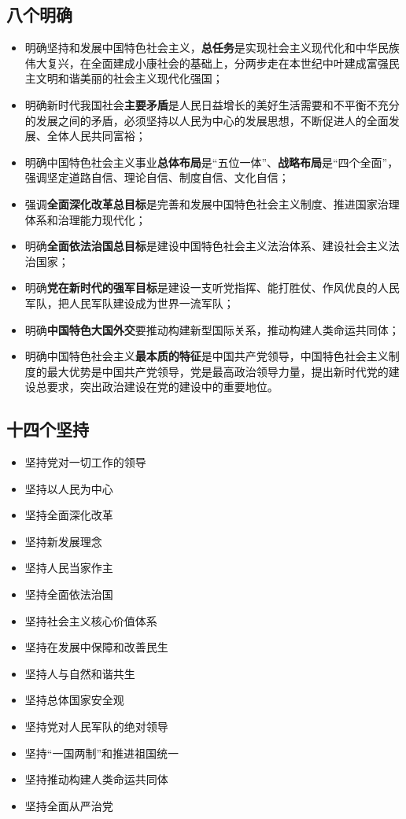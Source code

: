 \documentclass[a4paper, UTF8]{ctexart}
\begin{document}
    \subsection{八个明确}
    \begin{itemize}
        \item 明确坚持和发展中国特色社会主义，\textbf{总任务}是实现社会主义现代化和中华民族伟大复兴，在全面建成小康社会的基础上，分两步走在本世纪中叶建成富强民主文明和谐美丽的社会主义现代化强国；
        \item 明确新时代我国社会\textbf{主要矛盾}是人民日益增长的美好生活需要和不平衡不充分的发展之间的矛盾，必须坚持以人民为中心的发展思想，不断促进人的全面发展、全体人民共同富裕；
        \item 明确中国特色社会主义事业\textbf{总体布局}是“五位一体”、\textbf{战略布局}是“四个全面”，强调坚定道路自信、理论自信、制度自信、文化自信；
        \item 强调\textbf{全面深化改革总目标}是完善和发展中国特色社会主义制度、推进国家治理体系和治理能力现代化；
        \item 明确\textbf{全面依法治国总目标}是建设中国特色社会主义法治体系、建设社会主义法治国家；
        \item 明确\textbf{党在新时代的强军目标}是建设一支听党指挥、能打胜仗、作风优良的人民军队，把人民军队建设成为世界一流军队；
        \item 明确\textbf{中国特色大国外交}要推动构建新型国际关系，推动构建人类命运共同体；
        \item 明确中国特色社会主义\textbf{最本质的特征}是中国共产党领导，中国特色社会主义制度的最大优势是中国共产党领导，党是最高政治领导力量，提出新时代党的建设总要求，突出政治建设在党的建设中的重要地位。
    \end{itemize}

    \subsection{十四个坚持}
    \begin{itemize}
        \item 坚持党对一切工作的领导
        \item 坚持以人民为中心
        \item 坚持全面深化改革
        \item 坚持新发展理念
        \item 坚持人民当家作主
        \item 坚持全面依法治国
        \item 坚持社会主义核心价值体系
        \item 坚持在发展中保障和改善民生
        \item 坚持人与自然和谐共生
        \item 坚持总体国家安全观
        \item 坚持党对人民军队的绝对领导
        \item 坚持“一国两制”和推进祖国统一
        \item 坚持推动构建人类命运共同体
        \item 坚持全面从严治党
    \end{itemize}
\end{document}
